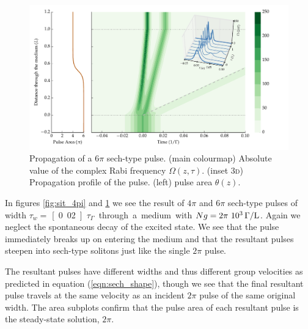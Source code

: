     \begin{figure}[]
      \includegraphics[width=\linewidth]
        {figs/03_nonlinear/coh_sech_6_0pi_fwhm0_020_Ng01000_fig6.pdf}
      \caption{
      Propagation of a $6 \pi$ sech-type pulse. (main colourmap) Absolute value
      of the complex Rabi frequency $\Omega(z, \tau)$. (inset \textsc{3d})
      Propagation profile of the pulse. (left) pulse area $\theta(z)$.
      }
      \label{fig:sit_6pi}
    \end{figure}

    In figures \ref{fig:sit_4pi} and \ref{fig:sit_6pi} we see the result of
    $4\pi$ and $6\pi$ sech-type pulses of width $\tau_w =$
    \unit[0.02]{$\tau_\Gamma$} through a medium with $Ng =
    \unit[2\pi~10^3]{\Gamma/L}$. Again we neglect the spontaneous decay of the
    excited state. We see that the pulse immediately breaks up on entering the
    medium and that the resultant pulses steepen into sech-type solitons just
    like the single $2\pi$ pulse.    

    The resultant pulses have different widths and thus different group
    velocities as predicted in equation (\ref{eqn:sech_shape}), though we see
    that the final resultant pulse travels at the same velocity as an incident
    $2\pi$ pulse of the same original width. The area subplots confirm that the pulse area of each resultant pulse is the steady-state solution, $2\pi$.

